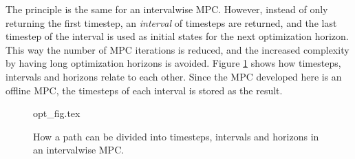 The principle is the same for an intervalwise MPC. However, instead of only returning the first timestep, an \textit{interval} of timesteps are returned, and the last timestep of the interval is used as initial states for the next optimization horizon. This way the number of MPC iterations is reduced, and the increased complexity by having long optimization horizons is avoided. Figure \ref{fig:opt_fig} shows how timesteps, intervals and horizons relate to each other. Since the MPC developed here is an offline MPC, the timesteps of each interval is stored as the result.

\begin{figure}
	{opt_fig.tex}
	\caption{How a path can be divided into timesteps, intervals and horizons in an intervalwise MPC.}
	\label{fig:opt_fig}
\end{figure}